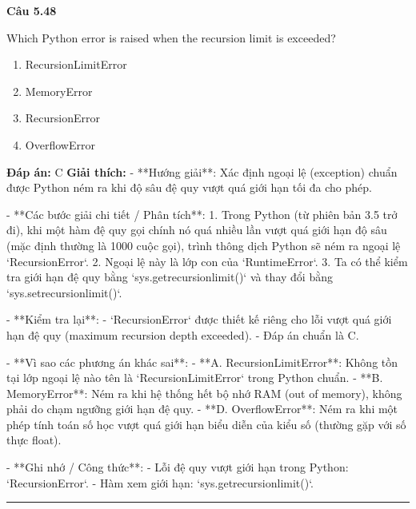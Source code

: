 \documentclass[11pt,a4paper]{article}
\newenvironment{question}[1]{%
  \par\vspace{1em}\noindent\textbf{\large Câu #1}\par\vspace{0.4em}
}{%
  \par\vspace{1em}\hrule\vspace{0.6em}
}
\newenvironment{choices}{%
  \begin{enumerate}[label=\textbf{\Alph*.},leftmargin=2.2em,itemsep=2pt,topsep=3pt]
}{%
  \end{enumerate}
}
\newcommand{\choice}{\item}
\begin{document}
\begin{question}{5.48}
Which Python error is raised when the recursion limit is exceeded?
\begin{choices}
\choice RecursionLimitError
\choice MemoryError
\choice RecursionError
\choice OverflowError
\end{choices}
\textbf{Đáp án:} C
\textbf{Giải thích:} - **Hướng giải**:
  Xác định ngoại lệ (exception) chuẩn được Python ném ra khi độ sâu đệ quy vượt quá giới hạn tối đa cho phép.

- **Các bước giải chi tiết / Phân tích**:
  1. Trong Python (từ phiên bản 3.5 trở đi), khi một hàm đệ quy gọi chính nó quá nhiều lần vượt quá giới hạn độ sâu (mặc định thường là 1000 cuộc gọi), trình thông dịch Python sẽ ném ra ngoại lệ `RecursionError`.
  2. Ngoại lệ này là lớp con của `RuntimeError`.
  3. Ta có thể kiểm tra giới hạn đệ quy bằng `sys.getrecursionlimit()` và thay đổi bằng `sys.setrecursionlimit()`.

- **Kiểm tra lại**:
  - `RecursionError` được thiết kế riêng cho lỗi vượt quá giới hạn đệ quy (maximum recursion depth exceeded).
  - Đáp án chuẩn là C.

- **Vì sao các phương án khác sai**:
  - **A. RecursionLimitError**: Không tồn tại lớp ngoại lệ nào tên là `RecursionLimitError` trong Python chuẩn.
  - **B. MemoryError**: Ném ra khi hệ thống hết bộ nhớ RAM (out of memory), không phải do chạm ngưỡng giới hạn đệ quy.
  - **D. OverflowError**: Ném ra khi một phép tính toán số học vượt quá giới hạn biểu diễn của kiểu số (thường gặp với số thực float).

- **Ghi nhớ / Công thức**:
  - Lỗi đệ quy vượt giới hạn trong Python: `RecursionError`.
  - Hàm xem giới hạn: `sys.getrecursionlimit()`.
\end{question}
\end{document}
